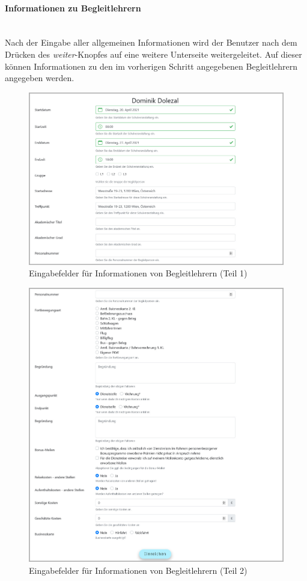 \paragraph{Informationen zu Begleitlehrern}~
\label{code_submit_data}~\\
Nach der Eingabe aller allgemeinen Informationen wird der Benutzer nach dem Drücken des \textit{weiter}-Knopfes auf eine weitere Unterseite weitergeleitet. Auf dieser können Informationen zu den im vorherigen Schritt angegebenen Begleitlehrern angegeben werden.
\begin{figure}[H]
	\centering
	\includegraphics[width=1\linewidth]{images/rfoster_implementierung/escort1}
	\caption[Begleitlehrerinformationen eingeben (Teil 1)]{Eingabefelder für Informationen von Begleitlehrern (Teil 1)}
	\label{fig:escorts1}
\end{figure}
\begin{figure}[H]
	\centering
	\includegraphics[width=1\linewidth]{images/rfoster_implementierung/escort2}
	\caption[Begleitlehrerinformationen eingeben (Teil 2)]{Eingabefelder für Informationen von Begleitlehrern (Teil 2)}
	\label{fig:escorts2}
\end{figure}
